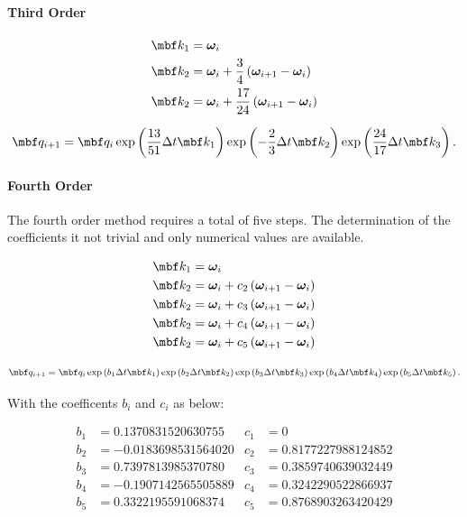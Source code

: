 \documentclass[10pt,a4paper]{article}
\newcommand{\mbs}[1]{{\boldsymbol{#1}}}
\numberwithin{equation}{section}
\begin{document}
\paragraph{Third Order}

\begin{align*}
\mbf k_1 & = \mbs \omega_i \\
\mbf k_2 & = \mbs \omega_i + \dfrac{3}{4} \left( \mbs \omega_{i+1} - \mbs \omega_i \right) \\
\mbf k_2 & = \mbs \omega_i + \dfrac{17}{24} \left( \mbs \omega_{i+1} - \mbs \omega_i \right)
\end{align*}

\begin{equation}
	\mbf q_{i+1} = \mbf q_i 
	\exp \left( \dfrac{13}{51} \Delta t \mbf k_1 \right)
	\exp \left( -\dfrac{2}{3} \Delta t \mbf k_2 \right)
	\exp \left( \dfrac{24}{17} \Delta t \mbf k_3 \right).
\end{equation}

\paragraph{Fourth Order}
The fourth order method requires a total of five steps. The determination of the coefficients it not trivial and only numerical values are available.

\begin{align*}
\mbf k_1 & = \mbs \omega_i \\
\mbf k_2 & = \mbs \omega_i + c_2 \left( \mbs \omega_{i+1} - \mbs \omega_i \right) \\
\mbf k_2 & = \mbs \omega_i + c_3 \left( \mbs \omega_{i+1} - \mbs \omega_i \right) \\
\mbf k_2 & = \mbs \omega_i + c_4 \left( \mbs \omega_{i+1} - \mbs \omega_i \right) \\
\mbf k_2 & = \mbs \omega_i + c_5 \left( \mbs \omega_{i+1} - \mbs \omega_i \right)
\end{align*}

\begin{equation}
	\mbf q_{i+1} = \mbf q_i 
	\exp \left(b_1 \Delta t \mbf k_1 \right)
	\exp \left(b_2 \Delta t \mbf k_2 \right)
	\exp \left(b_3 \Delta t \mbf k_3 \right)
	\exp \left(b_4 \Delta t \mbf k_4 \right)
	\exp \left(b_5 \Delta t \mbf k_5 \right).
\end{equation}

With the coefficents $b_i$ and $c_i$  as below:

\begin{align*}
b_1 &= 0.1370831520630755 & c_1 & = 0 \\
b_2 & = -0.0183698531564020 & c_2 & = 0.8177227988124852 \\
b_3 & =0.7397813985370780 & c_3 & = 0.3859740639032449 \\
b_4 & = -0.1907142565505889 & c_4 & = 0.3242290522866937 \\
b_5 & = 0.3322195591068374 & c_5 & = 0.8768903263420429
\end{align*}
\end{document}
